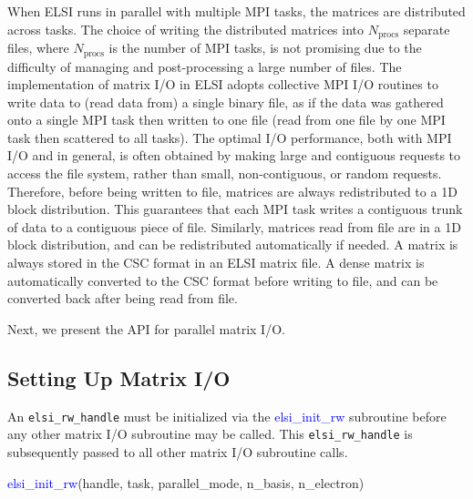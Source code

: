 \documentclass{report}
\begin{document}
When ELSI runs in parallel with multiple MPI tasks, the matrices are distributed across tasks. The choice of writing the distributed matrices into $N_\text{procs}$ separate files, where $N_\text{procs}$ is the number of MPI tasks, is not promising due to the difficulty of managing and post-processing a large number of files. The implementation of matrix I/O in ELSI adopts collective MPI I/O routines to write data to (read data from) a single binary file, as if the data was gathered onto a single MPI task then written to one file (read from one file by one MPI task then scattered to all tasks). The optimal I/O performance, both with MPI I/O and in general, is often obtained by making large and contiguous requests to access the file system, rather than small, non-contiguous, or random requests. Therefore, before being written to file, matrices are always redistributed to a 1D block distribution. This guarantees that each MPI task writes a contiguous trunk of data to a contiguous piece of file. Similarly, matrices read from file are in a 1D block distribution, and can be redistributed automatically if needed. A matrix is always stored in the CSC format in an ELSI matrix file. A dense matrix is automatically converted to the CSC format before writing to file, and can be converted back after being read from file.

Next, we present the API for parallel matrix I/O.

\subsection{Setting Up Matrix I/O}
\label{subsec:rw_init}
An \texttt{elsi\_rw\_handle} must be initialized via the \textcolor{blue}{elsi\_init\_rw} subroutine before any other matrix I/O subroutine may be called. This \texttt{elsi\_rw\_handle} is subsequently passed to all other matrix I/O subroutine calls.
\begin{labeling}{\hspace{6cm}}
\item [\hspace{0.3cm} \textcolor{blue}{elsi\_init\_rw}(handle, task, parallel\_mode, n\_basis, n\_electron)]
\end{labeling}
\end{document}
